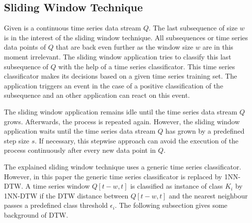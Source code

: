 \subsection{Sliding Window Technique} \label{sliding_window_technique}
Given is a continuous time series data stream $Q$. The last subsequence of size $w$ is in the interest of the sliding
window technique. All subsequences or time series data points of $Q$ that are back even further as the window size $w$
are in this moment irrelevant. The sliding window application tries to classify this last subsequence of $Q$ with the
help of a time series classificator. This time series classificator makes its decisions based on a given time series
training set. The application triggers an event in the case of a positive classification of the subsequence and an other
application can react on this event.

The sliding window application remains idle until the time series data stream $Q$
grows. Afterwards, the process is repeated again. However, the sliding window application waits until the time series
data stream $Q$ has grown by a predefined step size $s$. If necessary, this stepwise approach can avoid the execution of
the process continuously after every new data point in $Q$.

The explained sliding window technique uses a generic time series classificator. However, in this paper the
generic time series classificator is replaced by 1NN-DTW. A time series window $Q[t-w,t]$ is classified as instance of
class $K_i$ by 1NN-DTW if the DTW distance between $Q[t-w,t]$ and the nearest neighbour passes a predefined
class threshold $\epsilon_i$. The following subsection gives some background of DTW.
